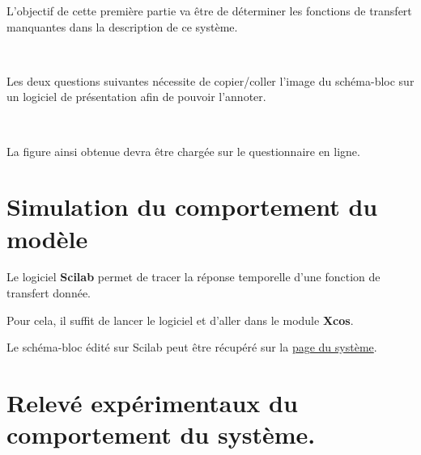 L'objectif de cette première partie va être de déterminer les fonctions de transfert manquantes dans la description de ce système.

~\

Les deux questions suivantes nécessite de copier/coller l'image du schéma-bloc sur un logiciel de présentation afin de pouvoir l'annoter.



~\

La figure ainsi obtenue devra être chargée sur le questionnaire en ligne.

\section{Simulation du comportement du modèle}

Le logiciel \textbf{Scilab} permet de tracer la réponse temporelle d'une fonction de transfert donnée.

Pour cela, il suffit de lancer le logiciel et d'aller dans le module \textbf{Xcos}.

Le schéma-bloc édité sur Scilab peut être récupéré sur la \href{https://www.costadoat.fr/systeme/\systemesnum}{page du système}.



\section{Relevé expérimentaux du comportement du système.}




\ifdef{\public}{}{}

\newpage

\pagestyle{correction}\setcounter{section}{0}




